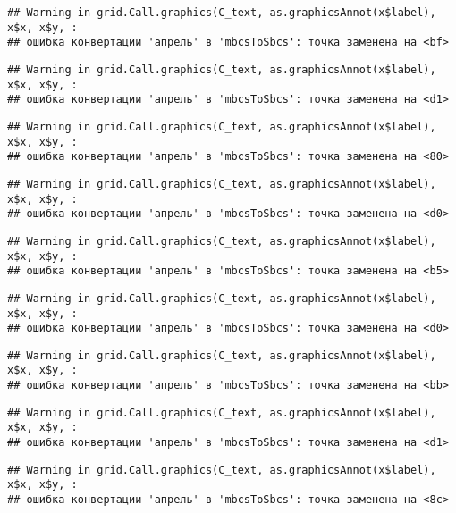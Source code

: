 \documentclass[
]{article}
\begin{document}
\begin{verbatim}
## Warning in grid.Call.graphics(C_text, as.graphicsAnnot(x$label), x$x, x$y, :
## ошибка конвертации 'апрель' в 'mbcsToSbcs': точка заменена на <bf>
\end{verbatim}

\begin{verbatim}
## Warning in grid.Call.graphics(C_text, as.graphicsAnnot(x$label), x$x, x$y, :
## ошибка конвертации 'апрель' в 'mbcsToSbcs': точка заменена на <d1>
\end{verbatim}

\begin{verbatim}
## Warning in grid.Call.graphics(C_text, as.graphicsAnnot(x$label), x$x, x$y, :
## ошибка конвертации 'апрель' в 'mbcsToSbcs': точка заменена на <80>
\end{verbatim}

\begin{verbatim}
## Warning in grid.Call.graphics(C_text, as.graphicsAnnot(x$label), x$x, x$y, :
## ошибка конвертации 'апрель' в 'mbcsToSbcs': точка заменена на <d0>
\end{verbatim}

\begin{verbatim}
## Warning in grid.Call.graphics(C_text, as.graphicsAnnot(x$label), x$x, x$y, :
## ошибка конвертации 'апрель' в 'mbcsToSbcs': точка заменена на <b5>
\end{verbatim}

\begin{verbatim}
## Warning in grid.Call.graphics(C_text, as.graphicsAnnot(x$label), x$x, x$y, :
## ошибка конвертации 'апрель' в 'mbcsToSbcs': точка заменена на <d0>
\end{verbatim}

\begin{verbatim}
## Warning in grid.Call.graphics(C_text, as.graphicsAnnot(x$label), x$x, x$y, :
## ошибка конвертации 'апрель' в 'mbcsToSbcs': точка заменена на <bb>
\end{verbatim}

\begin{verbatim}
## Warning in grid.Call.graphics(C_text, as.graphicsAnnot(x$label), x$x, x$y, :
## ошибка конвертации 'апрель' в 'mbcsToSbcs': точка заменена на <d1>
\end{verbatim}

\begin{verbatim}
## Warning in grid.Call.graphics(C_text, as.graphicsAnnot(x$label), x$x, x$y, :
## ошибка конвертации 'апрель' в 'mbcsToSbcs': точка заменена на <8c>
\end{verbatim}
\end{document}
